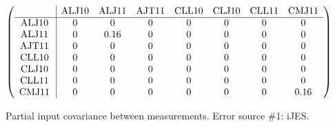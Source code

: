 \begin{table}[H]
\scriptsize
\begin{center}
\renewcommand{\arraystretch}{1.1}
\begin{math}\left(\begin{array}{c|ccccccc}
 & \mathrm{ALJ10} & 
\mathrm{ALJ11} & 
\mathrm{AJT11} & 
\mathrm{CLL10} & 
\mathrm{CLJ10} & 
\mathrm{CLL11} & 
\mathrm{CMJ11} \\
\hline
\mathrm{ALJ10} \hspace*{2pt} &  0 &  0 &  0 &  0 &  0 &  0 &  0 \\
\mathrm{ALJ11} \hspace*{2pt} &  0 &       0.16 &  0 &  0 &  0 &  0 &  0 \\
\mathrm{AJT11} \hspace*{2pt} &  0 &  0 &  0 &  0 &  0 &  0 &  0 \\
\mathrm{CLL10} \hspace*{2pt} &  0 &  0 &  0 &  0 &  0 &  0 &  0 \\
\mathrm{CLJ10} \hspace*{2pt} &  0 &  0 &  0 &  0 &  0 &  0 &  0 \\
\mathrm{CLL11} \hspace*{2pt} &  0 &  0 &  0 &  0 &  0 &  0 &  0 \\
\mathrm{CMJ11} \hspace*{2pt} &  0 &  0 &  0 &  0 &  0 &  0 &       0.16 \\
\end{array}\right)\end{math}
\caption{Partial input covariance between measurements. Error source \#1: iJES.}
\renewcommand{\arraystretch}{1}
\end{center}
\end{table}
